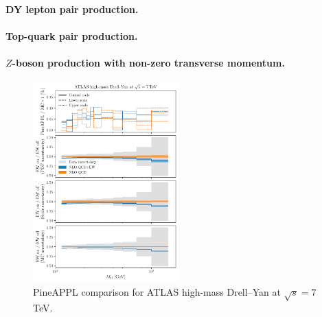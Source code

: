 \paragraph{DY lepton pair production.}




\paragraph{Top-quark pair production.}


\paragraph{$Z$-boson production with non-zero transverse momentum.}


\begin{figure}
    \centering
    \includegraphics[width=0.5\textwidth]{figures/pineappl_ATLASZHIGHMASS49FB}
    \caption{PineAPPL comparison for ATLAS high-mass Drell--Yan at $\sqrt{s}=7$ TeV.}
    \label{fig:atlaszhighmass49fb}
\end{figure}

